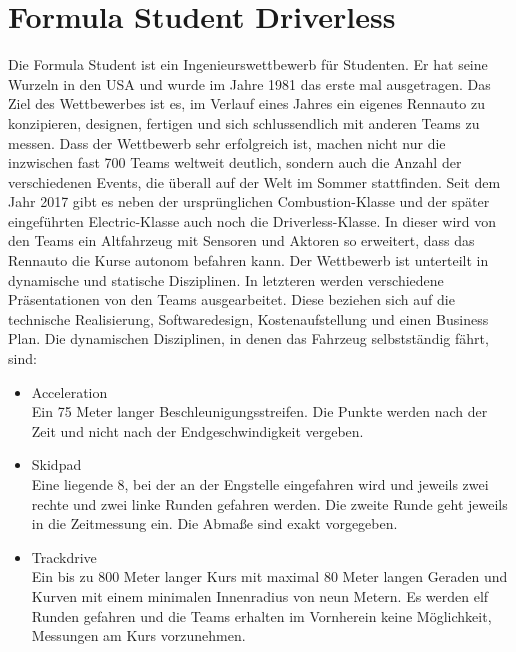\documentclass{like}
\begin{document}
\section{Formula Student Driverless}
Die Formula Student ist ein Ingenieurswettbewerb für Studenten. Er hat seine Wurzeln in den USA und wurde im Jahre 1981 das erste mal ausgetragen. Das Ziel des Wettbewerbes ist es, im Verlauf eines Jahres ein eigenes Rennauto zu konzipieren, designen, fertigen und sich schlussendlich mit anderen Teams zu messen. Dass der Wettbewerb sehr erfolgreich ist, machen nicht nur die inzwischen fast 700 Teams weltweit \cite{FsWorldRank:1} deutlich, sondern auch die Anzahl der verschiedenen Events, die überall auf der Welt im Sommer stattfinden. Seit dem Jahr 2017 gibt es neben der ursprünglichen Combustion-Klasse und der später eingeführten Electric-Klasse auch noch die Driverless-Klasse.
In dieser wird von den Teams ein Altfahrzeug mit Sensoren und Aktoren so erweitert, dass das Rennauto die Kurse autonom befahren kann.
Der Wettbewerb ist unterteilt in dynamische und statische Disziplinen. In letzteren werden verschiedene Präsentationen von den Teams ausgearbeitet. Diese beziehen sich auf die technische Realisierung, Softwaredesign, Kostenaufstellung und einen Business Plan.
Die dynamischen Disziplinen, in denen das Fahrzeug selbstständig fährt, sind:
\begin{itemize}
	\item Acceleration \\ Ein 75 Meter langer Beschleunigungsstreifen. Die Punkte werden nach der Zeit und nicht nach der Endgeschwindigkeit vergeben.
	\item Skidpad \\ Eine liegende 8, bei der an der Engstelle eingefahren wird und jeweils zwei rechte und zwei linke Runden gefahren werden. Die zweite Runde geht jeweils in die Zeitmessung ein. Die Abmaße sind exakt vorgegeben.
	\item Trackdrive \\ Ein bis zu 800 Meter langer Kurs mit maximal 80 Meter langen Geraden und Kurven mit einem minimalen Innenradius von neun Metern. Es werden elf Runden gefahren und die Teams erhalten im Vornherein keine Möglichkeit, Messungen am Kurs vorzunehmen.
\end{itemize}
\end{document}
